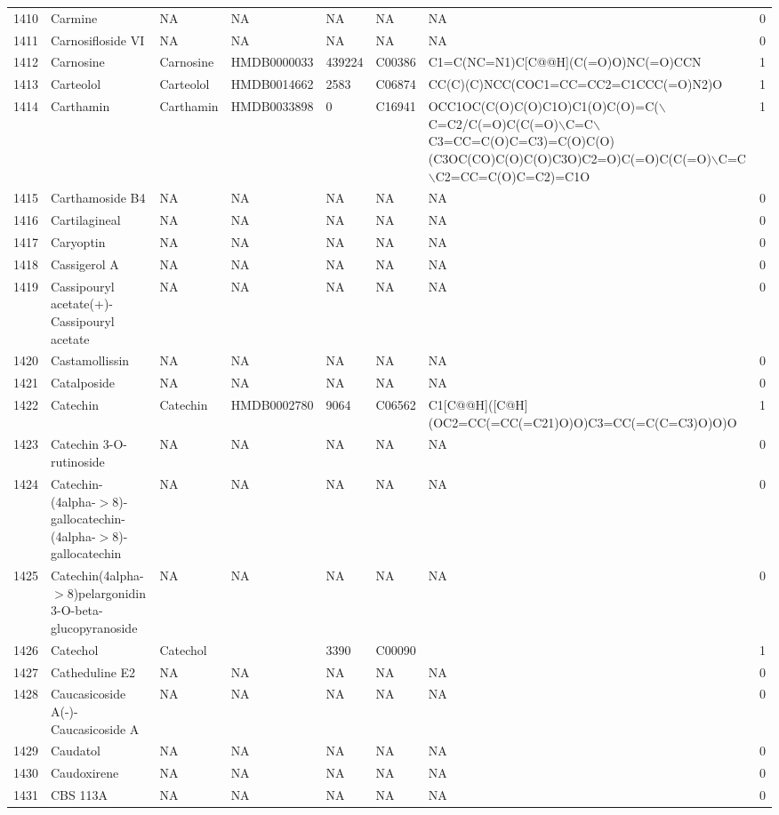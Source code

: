 \documentclass[a4paper]{article}
\begin{document}
\begin{longtable}{rlllllll}
  1410 & Carmine & NA & NA & NA & NA & NA & 0 \\ 
  1411 & Carnosifloside VI & NA & NA & NA & NA & NA & 0 \\ 
  1412 & Carnosine & Carnosine & HMDB0000033 & 439224 & C00386 & C1=C(NC=N1)C[C@@H](C(=O)O)NC(=O)CCN & 1 \\ 
  1413 & Carteolol & Carteolol & HMDB0014662 & 2583 & C06874 & CC(C)(C)NCC(COC1=CC=CC2=C1CCC(=O)N2)O & 1 \\ 
  1414 & Carthamin & Carthamin & HMDB0033898 & 0 & C16941 & OCC1OC(C(O)C(O)C1O)C1(O)C(O)=C($\backslash$C=C2/C(=O)C(C(=O)$\backslash$C=C$\backslash$C3=CC=C(O)C=C3)=C(O)C(O)(C3OC(CO)C(O)C(O)C3O)C2=O)C(=O)C(C(=O)$\backslash$C=C$\backslash$C2=CC=C(O)C=C2)=C1O & 1 \\ 
  1415 & Carthamoside B4 & NA & NA & NA & NA & NA & 0 \\ 
  1416 & Cartilagineal & NA & NA & NA & NA & NA & 0 \\ 
  1417 & Caryoptin & NA & NA & NA & NA & NA & 0 \\ 
  1418 & Cassigerol A & NA & NA & NA & NA & NA & 0 \\ 
  1419 & Cassipouryl acetate(+)-Cassipouryl acetate & NA & NA & NA & NA & NA & 0 \\ 
  1420 & Castamollissin & NA & NA & NA & NA & NA & 0 \\ 
  1421 & Catalposide & NA & NA & NA & NA & NA & 0 \\ 
  1422 & Catechin & Catechin & HMDB0002780 & 9064 & C06562 & C1[C@@H]([C@H](OC2=CC(=CC(=C21)O)O)C3=CC(=C(C=C3)O)O)O & 1 \\ 
  1423 & Catechin 3-O-rutinoside & NA & NA & NA & NA & NA & 0 \\ 
  1424 & Catechin-(4alpha-$>$8)-gallocatechin-(4alpha-$>$8)-gallocatechin & NA & NA & NA & NA & NA & 0 \\ 
  1425 & Catechin(4alpha-$>$8)pelargonidin 3-O-beta-glucopyranoside & NA & NA & NA & NA & NA & 0 \\ 
  1426 & Catechol & Catechol &  & 3390 & C00090 &  & 1 \\ 
  1427 & Catheduline E2 & NA & NA & NA & NA & NA & 0 \\ 
  1428 & Caucasicoside A(-)-Caucasicoside A & NA & NA & NA & NA & NA & 0 \\ 
  1429 & Caudatol & NA & NA & NA & NA & NA & 0 \\ 
  1430 & Caudoxirene & NA & NA & NA & NA & NA & 0 \\ 
  1431 & CBS 113A & NA & NA & NA & NA & NA & 0 \\ 

\end{longtable}
\end{document}

